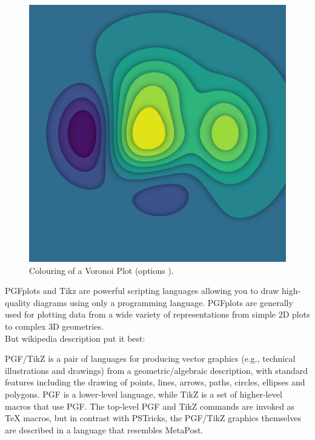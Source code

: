 \documentclass[minted, draw, cover = contour]{../tex/hebdomon}
\begin{document}
\newpage

\begin{figure}[ht]
	\centering
	\includegraphics[width=0.6\pagewidth]{../coverArts/ContourShadow.png}
	\caption{Colouring of a Voronoi Plot (options ).}
\end{figure}



PGFplots and Tikz are powerful scripting languages allowing you to draw high-quality diagrams
using only a programming language. PGFplots are generally used for plotting data from a wide
variety of representations from simple 2D plots to complex 3D geometries.
\\
But wikipedia description put it best:

\begin{excerpt}
	PGF/TikZ is a pair of languages for producing vector graphics
	(e.g., technical illustrations and drawings) from a geometric/algebraic description, with
	standard features including the drawing of points, lines, arrows, paths, circles,
	ellipses and polygons. PGF is a lower-level language, while TikZ is a set of higher-level
	macros that use PGF. The top-level PGF and TikZ commands are invoked as TeX macros,
	but in contrast with PSTricks, the PGF/TikZ graphics themselves are described in a
	language that resembles MetaPost.
\end{excerpt}
\end{document}
